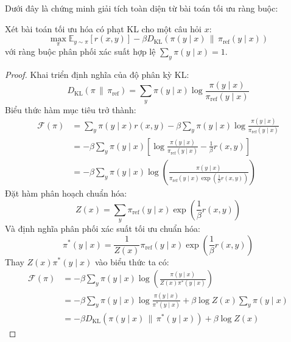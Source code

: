 Dưới đây là chứng minh giải tích toàn diện từ bài toán tối ưu ràng buộc:

\begin{theorem}
Xét bài toán tối ưu hóa có phạt KL cho một câu hỏi $x$:
\begin{equation}
\max_{\pi} \mathbb{E}_{y \sim \pi}\left[ r(x, y) \right] - \beta D_{\text{KL}}\left(\pi(y \mid x) \,\|\, \pi_{\text{ref}}(y \mid x)\right)
\end{equation}
với ràng buộc phân phối xác suất hợp lệ $\sum_y \pi(y \mid x) = 1$.
\end{theorem}

\begin{proof}
Khai triển định nghĩa của độ phân kỳ KL:
\begin{equation}
D_{\text{KL}}(\pi \,\|\, \pi_{\text{ref}}) = \sum_y \pi(y \mid x) \log \frac{\pi(y \mid x)}{\pi_{\text{ref}}(y \mid x)}
\end{equation}
Biểu thức hàm mục tiêu trở thành:
\begin{align*}
\mathcal{F}(\pi) &= \sum_y \pi(y \mid x) r(x, y) - \beta \sum_y \pi(y \mid x) \log \frac{\pi(y \mid x)}{\pi_{\text{ref}}(y \mid x)} \\
&= -\beta \sum_y \pi(y \mid x) \left[ \log \frac{\pi(y \mid x)}{\pi_{\text{ref}}(y \mid x)} - \frac{1}{\beta} r(x, y) \right] \\
&= -\beta \sum_y \pi(y \mid x) \log \left( \frac{\pi(y \mid x)}{\pi_{\text{ref}}(y \mid x) \exp\left(\frac{1}{\beta} r(x, y)\right)} \right)
\end{align*}
Đặt hàm phân hoạch chuẩn hóa:
\begin{equation}
Z(x) = \sum_y \pi_{\text{ref}}(y \mid x) \exp\left(\frac{1}{\beta} r(x, y)\right)
\end{equation}
Và định nghĩa phân phối xác suất tối ưu chuẩn hóa:
\begin{equation}
\pi^*(y \mid x) = \frac{1}{Z(x)} \pi_{\text{ref}}(y \mid x) \exp\left(\frac{1}{\beta} r(x, y)\right)
\end{equation}
Thay $Z(x) \pi^*(y \mid x)$ vào biểu thức ta có:
\begin{align*}
\mathcal{F}(\pi) &= -\beta \sum_y \pi(y \mid x) \log \left( \frac{\pi(y \mid x)}{Z(x) \pi^*(y \mid x)} \right) \\
&= -\beta \sum_y \pi(y \mid x) \log \frac{\pi(y \mid x)}{\pi^*(y \mid x)} + \beta \log Z(x) \sum_y \pi(y \mid x) \\
&= -\beta D_{\text{KL}}\left(\pi(y \mid x) \,\|\, \pi^*(y \mid x)\right) + \beta \log Z(x)

\end{align*}
\end{proof}
